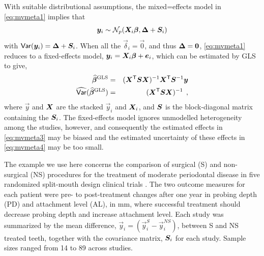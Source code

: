 With suitable distributional assumptions, the mixed=effects model in \eqref{eq:mvmeta1} implies that
\begin{equation}\label{eq:mvmeta2}
	\bm{y}_i \sim \mathcal{N}_p ( \bm{X}_i \bm{\beta}, \bm{\Delta} + \bm{S}_i)
\end{equation}
with $\mathsf{Var}(\bm{y}_i) = \bm{\Delta} + \bm{S}_i$. When all the
$\vec{\delta}_i = \vec{0}$, and thus $\bm{\Delta}=\bm{0}$,
\eqref{eq:mvmeta1} reduces to a fixed-effects model, $\bm{y}_i = \bm{X}_i \bm{\beta} + \bm{e}_i$,
which can be estimated by GLS to give,
\begin{eqnarray}
\widehat{\bm{\beta}}^{\textrm{GLS}} & = & (\bm{X}^\mathsf{T} \bm{S} \bm{X})^{-1} \bm{X}^\mathsf{T} \bm{S}^{-1} \bm{y} \label{eq:mvmeta3} \\
\widehat{\mathsf{Var}}(\widehat{\bm{\beta}}^{\textrm{GLS}}) & = & (\bm{X}^\mathsf{T} \bm{S} \bm{X})^{-1}  \label{eq:mvmeta4} \:\: ,
\end{eqnarray}
where $\vec{y}$ and $\bm{X}$ are the stacked $\vec{y}_i$ and $\bm{X}_i$, and
$\bm{S}$ is the block-diagonal matrix containing the $\bm{S}_i$.
The fixed-effects model ignores unmodelled heterogeneity among the studies, however,
and consequently the estimated effects in \eqref{eq:mvmeta3} may be biased and
the estimated uncertainty of these effects in \eqref{eq:mvmeta4} may be too small.

The example we use here concerns the comparison of surgical (S) and
non-surgical (NS) procedures for the treatment of moderate periodontal
disease in five randomized split-mouth design clinical trials
\citep{Antczak-Bouckoms-etal:1993,Berkey-etal:1998}.
The two outcome measures for each patient were pre- to post-treatment changes after one year
in probing depth (PD) and attachment level (AL), in mm, where successful treatment
should decrease probing depth and increase attachment level.
Each study was summarized by the mean difference, $\vec{y}_i = (\vec{y}_i^S - \vec{y}_i^{NS})$,
between S and NS treated teeth, together with the covariance matrix, $\bm{S}_i$ for each study.
Sample sizes ranged from 14 to 89 across studies.

